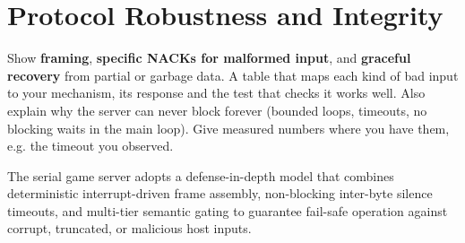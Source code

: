 \section{Protocol Robustness and Integrity}
\label{sec:robust}

\begin{guidance}
Show \textbf{framing}, \textbf{specific NACKs for malformed input}, and
\textbf{graceful recovery} from partial or garbage data. A table that maps each
kind of bad input to your mechanism, its response and the test that checks it
works well. Also explain why the server can never block forever (bounded
loops, timeouts, no blocking waits in the main loop). Give measured numbers
where you have them, e.g. the timeout you observed.
\end{guidance}

The serial game server adopts a defense-in-depth model that combines deterministic interrupt-driven frame assembly, non-blocking inter-byte silence timeouts, and multi-tier semantic gating to guarantee fail-safe operation against corrupt, truncated, or malicious host inputs.

